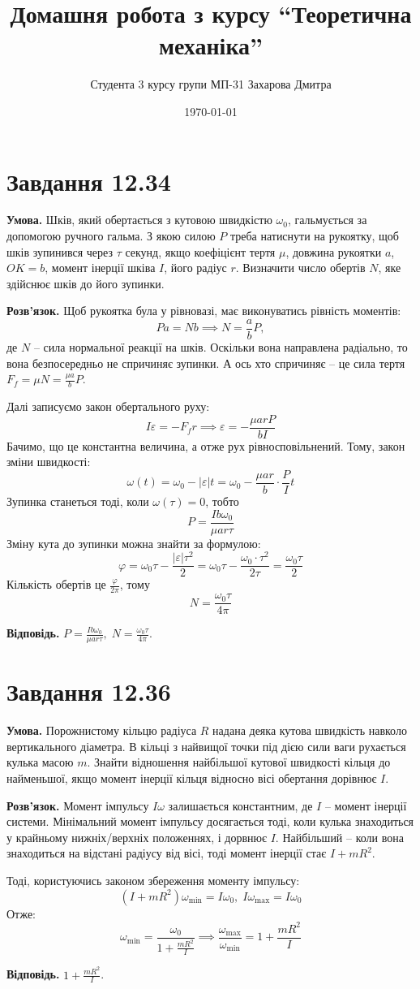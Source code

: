 \documentclass[14pt]{extarticle}
\title{Домашня робота з курсу ``Теоретична механіка''}
\author{Студента 3 курсу групи МП-31 Захарова Дмитра}
\date{\today}
\begin{document}
\maketitle

\section*{Завдання 12.34}

\textbf{Умова.} Шків, який обертається з кутовою швидкістю $\omega_0$, гальмується за допомогою ручного гальма. З якою силою $P$ треба натиснути на рукоятку, щоб шків зупинився через $\tau$ секунд, якщо коефіцієнт тертя $\mu$, довжина рукоятки $a$, $OK=b$, момент інерції шківа $I$, його радіус $r$. Визначити число обертів $N$, яке здійснює шків до його зупинки.

\textbf{Розв'язок.} Щоб рукоятка була у рівновазі, має виконуватись рівність моментів:
\[
Pa = Nb \implies N = \frac{a}{b}P,
\]
де $N$ -- сила нормальної реакції на шків. Оскільки вона направлена радіально, то вона безпосередньо не спричиняє зупинки. А ось хто спричиняє -- це сила тертя $F_f = \mu N = \frac{\mu a}{b}P$. 

Далі записуємо закон обертального руху:
\[
I \varepsilon = -F_f r \implies \varepsilon = -\frac{\mu a r P}{b I}
\]
Бачимо, що це константна величина, а отже рух рівносповільнений. Тому, закон зміни швидкості:
\[
\omega(t) = \omega_0 - |\varepsilon| t = \omega_0 - \frac{\mu a r}{b} \cdot \frac{P}{I} t 
\]
Зупинка станеться тоді, коли $\omega(\tau)=0$, тобто
\[
P = \frac{Ib\omega_0}{\mu a r \tau }
\]
Зміну кута до зупинки можна знайти за формулою:
\[
\varphi = \omega_0 \tau - \frac{|\varepsilon|\tau^2}{2} = \omega_0\tau - \frac{\omega_0 \cdot \tau^2}{2\tau} = \frac{\omega_0\tau}{2}
\]
Кількість обертів це $\frac{\varphi}{2\pi}$, тому
\[
N = \frac{\omega_0\tau}{4\pi}
\]

\textbf{Відповідь.} $P = \frac{Ib\omega_0}{\mu a r \tau}, \; N = \frac{\omega_0\tau}{4\pi}$.

\section*{Завдання 12.36}

\textbf{Умова.} Порожнистому кільцю радіуса $R$ надана деяка кутова швидкість навколо вертикального діаметра. В кільці з найвищої точки під дією сили ваги рухається кулька масою $m$. Знайти відношення найбільшої кутової швидкості кільця до найменьшої, якщо момент інерції кільця відносно вісі обертання дорівнює $I$.

\textbf{Розв'язок.} Момент імпульсу $I\omega$ залишається константним, де $I$ -- момент інерції системи. Мінімальний момент імпульсу досягається тоді, коли кулька знаходиться у крайньому нижніх/верхніх положеннях, і дорвнює $I$. Найбільший -- коли вона знаходиться на відстані радіусу від вісі, тоді момент інерції стає $I + mR^2$. 

Тоді, користуючись законом збереження моменту імпульсу:
\[
(I+mR^2)\omega_{\min} = I\omega_0, \; I\omega_{\max} = I\omega_0
\]
Отже:
\[
\omega_{\min} = \frac{\omega_0}{1+\frac{mR^2}{I}} \implies \frac{\omega_{\max}}{\omega_{\min}} = 1 + \frac{mR^2}{I}
\]

\textbf{Відповідь.} $1 + \frac{mR^2}{I}$.
\end{document}
